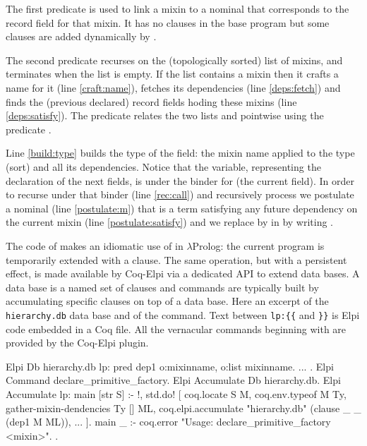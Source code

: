 \documentclass[a4paper,UKenglish,cleveref, autoref]{lipics-v2019}
\newcommand{\mixin}{mixin}
\theoremstyle{implem}
\theoremstyle{implem}
\theoremstyle{axiom}
\theoremstyle{abscommand}
\theoremstyle{command}
\begin{document}
{{The first predicate  is used
to link a \mixin{} to a nominal that corresponds to the record field
for that mixin. It has no clauses in the base program but some clauses
are added dynamically by .

The second predicate recurses on the (topologically sorted) list of mixins,
and terminates when the list is empty. If the list contains a \mixin{} 
then it crafts a name for it  (line \ref{craft:name}),
fetches its dependencies (line \ref{deps:fetch}) and
finds the (previous declared) record fields hoding these mixins
(line \ref{deps:satisfy}).
The  predicate relates the two lists  and
 pointwise using the predicate .

Line \ref{build:type} builds the type of the field: the \mixin{} name applied
to the type (sort) and all its dependencies.
Notice that the  variable, representing the declaration of the
next fields, is under the binder for  (the current field).
In order to recurse under that binder (line \ref{rec:call})
and recursively process  we postulate a nominal
 (line \ref{postulate:m}) that is a term satisfying any
future dependency on the current \mixin{} (line \ref{postulate:satisfy})
and we replace  by  in  by writing
.

The code of  makes an idiomatic use
of \elpi{=>} in $\lambda$Prolog: the current program is temporarily
extended with a clause. The same operation, but with a persistent
effect, is made available by Coq-Elpi via a dedicated API to extend
data bases. A data base is a named set of clauses and
commands are typically built by accumulating specific clauses on top
of a data base. Here an excerpt of the \verb+hierarchy.db+ data base and
of the  command. Text between \verb+lp:{{+ and \verb+}}+
is Elpi code embedded in a Coq file. All the vernacular commands beginning
with  are provided by the Coq-Elpi plugin.

\begin{coqcode}
Elpi Db hierarchy.db lp:{{
  pred dep1 o:mixinname, o:list mixinname.
  ... %
}}.
Elpi Command declare_primitive_factory.
Elpi Accumulate Db hierarchy.db.
Elpi Accumulate lp:{{
  main [str S] :- !, std.do! [
    coq.locate S M,
    coq.env.typeof M Ty,
    gather-mixin-dendencies Ty [] ML, %
    coq.elpi.accumulate "hierarchy.db" (clause _ _ (dep1 M ML)),
    ...
  ].
  main _ :- coq.error "Usage: declare_primitive_factory <mixin>".
}}.
\end{coqcode}

}}
\end{document}
